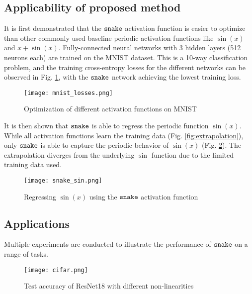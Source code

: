 \subsection{Applicability of proposed method}
It is first demonstrated that the $ \operatorname{\texttt{snake}} $ activation function is easier to optimize than other commonly used baseline periodic activation functions like $\sin(x)$ and $x + \sin(x)$. Fully-connected neural networks with 3 hidden layers (512 neurons each) are trained on the MNIST dataset. This is a 10-way classification problem, and the training cross-entropy losses for the different networks can be observed in Fig. {\ref{fig:mnist_loss}}, with the $ \operatorname{\texttt{snake}} $ network achieving the lowest training loss. \\

\begin{figure}[h]
\centering
\texttt{[image: mnist\_losses.png]}
\caption{Optimization of different activation functions on MNIST}
\label{fig:mnist_loss}
\end{figure}

It is then shown that $ \operatorname{\texttt{snake}} $ is able to regress the periodic function $\sin(x)$. While all activation functions learn the training data (Fig. \ref{fig:extrapolation}), only $ \operatorname{\texttt{snake}} $ is able to capture the periodic behavior of $\sin(x)$ (Fig. \ref{fig:sin_snake}). The extrapolation diverges from the underlying $ \sin $ function due to the limited training data used. \\


\begin{figure}[h]

\centering
\texttt{[image: snake\_sin.png]}
\caption{Regressing $\sin(x)$ using the $ \operatorname{\texttt{snake}} $ activation function}
\label{fig:sin_snake}
\end{figure}

\newpage
\subsection{Applications}
Multiple experiments are conducted to illustrate the performance of $ \operatorname{\texttt{snake}} $ on a range of tasks. \\

\begin{wrapfigure}{r}{2.1in}
  \begin{center}
    \texttt{[image: cifar.png]}
  \end{center}
  \caption{Test accuracy of ResNet18 with different non-linearities}
  \label{fig:cifar}
\end{wrapfigure}


